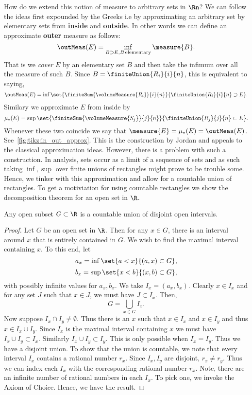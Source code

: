 How do we extend this notion of measure to arbitrary sets in $\Rn$? 
We can follow the ideas first expounded by the Greeks i.e by
approximating an arbitrary set by elementary sets from \textbf{inside} and \textbf{outside}. In other words we
can define an approximate \textbf{outer} measure as follows:
\[\outMeas(E) = \inf\limits_{B\supset E, B\, \text{elementary}} \measure{B}.\]
That is we \emph{cover} $E$ by an elementary set $B$ and then take the infimum over all the measure of such
$B$. Since $B = \finiteUnion{R_i}{i}{n}$, this is equivalent to saying,
\[\outMeas(E) = \inf\set{\finiteSum{\volumeMeasure{R_i}}{i}{n}}{\finiteUnion{R_i}{i}{n}\supset E}.\]
Similary we approximate $E$ from inside by
\[\mu_{\ast}(E) = \sup\set{\finiteSum{\volumeMeasure{S_j}}{j}{n}}{\finiteUnion{R_j}{j}{n}\subset E}.\]
Whenever these two coincide we say that $\measure{E} = \mu_{\ast}(E) = \outMeas(E)$.
See~\ref{fig:tikz:in_out_approx}. This is the construction
by Jordan and appeals to the classical approximation ideas. However, there is a problem with such a
construction. In analysis, sets occur as a limit of a sequence of sets and as such taking $\inf,\sup$ over
finite unions of rectangles might prove to be trouble some. Hence, we tinker with this approximation and allow
for a countable union of rectangles. To get a motiviation for using countable rectangles we
show the decomposition theorem for an open set in $\R$.
\begin{Proposition}[name=Decomposition of an open interval]\label{prop:open_set_countable_interval}
    Any open subset $G\subset\R$ is a countable union of disjoint open intervals.
\end{Proposition}
\begin{proof}
    Let $G$ be an open set in $\R$. Then for any $x \in G$, there is an interval around $x$ that is entirely
    contained in $G$. We wish to find the maximal interval containing $x$. To this end, let
    \[a_x = \inf\set{a < x}{(a,x)\subset G},\]
    \[b_x = \sup\set{x < b}{(x,b)\subset G},\]
    with possibly infinite values for $a_x,b_x$. We take $I_x = (a_x,b_x)$. Clearly $x \in I_x$ and for any
    set $J$ such that $x\in J$, we must have $J \subset I_x$. Then,
    \[G = \bigcup\limits_{x\in G}I_x.\]
    Now suppose $I_x \cap I_y \neq \emptyset$. Thus there is an $x$ such that $x \in I_x$ and $x \in I_y$ and
    thus $x \in I_x \cup I_y$. Since $I_x$ is the maximal interval containing $x$ we must have $I_x \cup I_y
    \subset I_x$. Similarly $I_x \cup I_y \subset I_y$. This is only possible when $I_x = I_y$. Thus we have
    a disjoint union. To show that the union is countable, we note that every interval $I_x$ contains a
    rational number $r_x$. Since $I_x,I_y$ are disjoint, $r_x \neq r_y$. Thus we can index each $I_x$ with the
    corresponding rational number $r_x$. Note, there are an infinite number of rational numbers in each $I_x$.
    To pick one, we invoke the Axiom of Choice. Hence, we have the result.
\end{proof}
